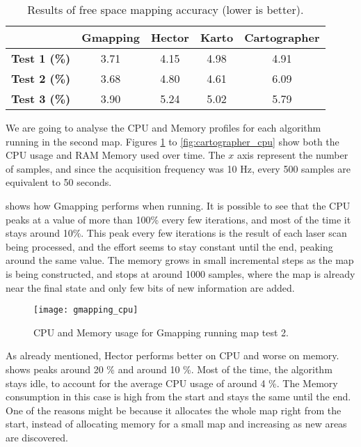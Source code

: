 \begin{table}[!ht]
\centering
\renewcommand*{\arraystretch}{1.1}
\begin{tabular}{c|c|c|c|c}
& \textbf{Gmapping} & \textbf{Hector} & \textbf{Karto} & \textbf{Cartographer} \\ \hline
\textbf{Test 1 (\%)} & 3.71 & 4.15 & 4.98 & 4.91 \\
\textbf{Test 2 (\%)} & 3.68 & 4.80 & 4.61 & 6.09 \\
\textbf{Test 3 (\%)} & 3.90 & 5.24 & 5.02 & 5.79 \\
 \hline
\end{tabular}
\caption{Results of free space mapping accuracy (lower is better).}
\label{tab:results_whitespace}
\end{table}

We are going to analyse the CPU and Memory profiles for each algorithm running in the second map. Figures \ref{fig:gmapping_cpu} to \ref{fig:cartographer_cpu} show both the CPU usage and RAM Memory used over time. The $x$ axis represent the number of samples, and since the acquisition frequency was 10 Hz, every 500 samples are equivalent to 50 seconds.

 shows how Gmapping performs when running. It is possible to see that the CPU peaks at a value of more than 100\% every few iterations, and most of the time it stays around 10\%. This peak every few iterations is the result of each laser scan being processed, and the effort seems to stay constant until the end, peaking around the same value. The memory grows in small incremental steps as the map is being constructed, and stops at around 1000 samples, where the map is already near the final state and only few bits of new information are added.

\begin{figure}[!ht]
    \centering
    \texttt{[image: gmapping\_cpu]}
    \caption{CPU and Memory usage for Gmapping running map test 2.}
    \label{fig:gmapping_cpu}
\end{figure}

As already mentioned, Hector performs better on CPU and worse on memory.  shows peaks around 20 \% and around 10 \%. Most of the time, the algorithm stays idle, to account for the average CPU usage of around 4 \%. The Memory consumption in this case is high from the start and stays the same until the end. One of the reasons might be because it allocates the whole map right from the start, instead of allocating memory for a small map and increasing as new areas are discovered.

